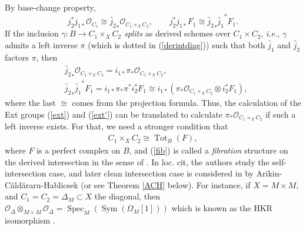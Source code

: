 \documentclass[12pt]{amsart}
\theoremstyle{definition}
\theoremstyle{remark}
\numberwithin{equation}{section}
\newcommand{\shO}{\mathcal{O}}
\newcommand{\Spec}{\operatorname{Spec}}
\newcommand{\Sym}{\operatorname{Sym}}
\newcommand{\Tot}{\operatorname{Tot}}
\newcommand{\arw}{\longrightarrow}
\begin{document}
By base-change property,
$$j_2^{*}j_{1*}\shO_{C_1}\cong \tilde{j_2}_*\shO_{C_1\times_X C_2},\qquad j_2^{*}j_{1*}F_1\cong \tilde{j_2}_*\tilde{j_1}^*F_1.$$ If the inclusion $\gamma: B\arw C_1\times_X C_2$ \emph{splits} as derived schemes over $C_1\times C_2$, \emph{i.e.}, $\gamma$ admits  a left inverse $\pi$ (which is dotted in (\ref{derintdiag})) such that both $\tilde{j_1}$ and $\tilde{j_2}$ factors $\pi$, then
\begin{align}\label{eq:bc1}
& \tilde{j_2}_*\shO_{C_1\times_X C_2}=i_{1*}\pi_*\shO_{C_1\times_X C_2},\\
&\tilde{j_2}_*\tilde{j_1}^*F_1=i_{1*}\pi_*\pi^*i_2^*F_1\cong i_{1*}(\pi_*\shO_{C_1\times_X C_2}\otimes i_2^*F_1),\label{eq:bc2}
\end{align}
where the last $\cong$ comes from the projection formula. 
Thus, the calculation of the Ext groups (\ref{ext}) and (\ref{ext'}) can be translated to calculate $\pi_*\shO_{C_1\times_X C_2}$ if such a left inverse exists. For that, we need a stronger condition that 
\begin{align}\label{fib}
    C_1\times_X C_2\cong \Tot_B(F),
\end{align}
where $F$ is a perfect complex on $B$, and (\ref{fib}) is called a \emph{fibration} structure on the derived intersection in the sense of \cite{arinkin2012self}. In loc. cit, the authors study the self-intersection case, and later clean intersection case is considered in \cite{arinkin2019formality} by Arikin-C\u{a}ld\u{a}raru-Hablicsek (or see Theorem \ref{ACH} below). For instance, if $X=M\times M$, and $C_1=C_2=\Delta_M\subset X$ the diagonal, then $\shO_{\Delta}\otimes_{M\times M}\shO_{\Delta}=\Spec_M(\Sym(\Omega_M[1]))$ which is known as the HKR isomorphism \cite{swan1996hochschild}. 
\end{document}
